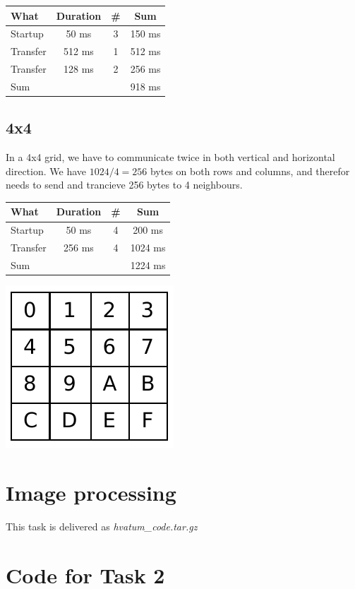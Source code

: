 \documentclass[english,a4paper,numbers=noenddot]{scrartcl}
\begin{document}
\begin{tabular}{|l|c|c|c|}
    \hline
    What & Duration & \# & Sum\\
\hline
\hline
Startup & 50 ms & 3 & 150 ms\\
Transfer & 512 ms & 1 & 512 ms\\
Transfer & 128 ms & 2 & 256 ms\\
\hline
Sum & & & 918 ms\\
\hline
\end{tabular}

\newpage
\subsection{4x4}
In a 4x4 grid, we have to communicate twice in both vertical and horizontal direction. We have $1024/4=256$ bytes on both rows and columns, and therefor needs to send and trancieve 256 bytes to 4 neighbours.


\begin{tabular}{|l|c|c|c|}
    \hline
    What & Duration & \# & Sum\\
\hline
\hline
Startup & 50 ms & 4 & 200 ms\\
Transfer & 256 ms & 4 & 1024 ms\\
\hline
Sum & & & 1224 ms\\
\hline
\end{tabular}

\includegraphics{task3c.pdf}

\section{Image processing}
This task is delivered as \emph{hvatum\_code.tar.gz}

\newpage
\appendix
\section{Code for Task 2}
\label{code}

\end{document}
